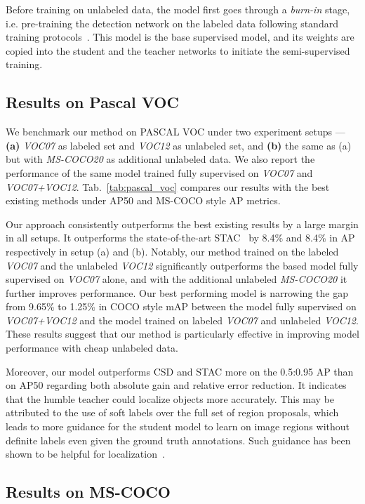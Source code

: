 \documentclass[final]{cvpr}
\begin{document}
Before training on unlabeled data, the model first goes through a \emph{burn-in} stage, i.e. pre-training the detection network on the labeled data following standard training protocols~\cite{ren2015faster}. This model is the base supervised model, and its weights are copied into the student and the teacher networks to initiate the semi-supervised training.

\subsection{Results on Pascal VOC}

We benchmark our method on PASCAL VOC under two experiment setups --- \textbf{(a)} \textit{VOC07} as labeled set and \textit{VOC12} as unlabeled set, and \textbf{(b)} the same as (a) but with \textit{MS-COCO20} as additional unlabeled data. We also report the performance of the same model trained fully supervised on \textit{VOC07} and \textit{VOC07+VOC12}. Tab.~\ref{tab:pascal_voc} compares our results with the best existing methods under AP50 and MS-COCO style AP metrics.

Our approach consistently outperforms the best existing results by a large margin in all setups. It outperforms the state-of-the-art STAC~\cite{sohn2020simple} by 8.4\% and 8.4\% in AP respectively in setup (a) and (b). Notably, our method trained on the labeled \textit{VOC07} and the unlabeled \textit{VOC12} significantly outperforms the based model fully supervised on \textit{VOC07} alone, and with the additional unlabeled \textit{MS-COCO20} it further improves performance. Our best performing model is narrowing the gap from 9.65\% to 1.25\% in COCO style mAP between the model fully supervised on \textit{VOC07+VOC12} and the model trained on labeled \textit{VOC07} and unlabeled \textit{VOC12}. These results suggest that our method is particularly effective in improving model performance with cheap unlabeled data.

Moreover, our model outperforms CSD and STAC more on the 0.5:0.95 AP than on AP50 regarding both absolute gain and relative error reduction.
It indicates that the humble teacher could localize objects more accurately. 
This may be attributed to the use of soft labels over the full set of region proposals, which leads to more guidance for the student model to learn on image regions without definite labels even given the ground truth annotations. 
Such guidance has been shown to be helpful for localization~\cite{zhang2015lmdis}.

\subsection{Results on MS-COCO}
\label{exp:res_on_coco}
\end{document}
